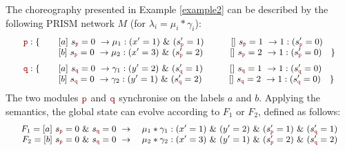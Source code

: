 \begin{example}\label{example3}
  The choreography presented in Example \ref{example2} can be
  described by the following PRISM network $M$ (for
  $\lambda_i=\mu_i*\gamma_i$):
\begin{displaymath}\small
  \begin{array}{llll}
    \role{p}: \{ & \quad \commandBase {a}{s_{\role p}=0} {\mu_1:(x'=1)
                   \ \&\ (s_{\role p}'=1)} 
                   \quad\qquad \commandBase {}{s_{\role p}=1} 
                   {1:(s_{\role p}'=0) }\\
                 & \quad \commandBase {b}{s_{\role p}=0} {\mu_2:(x'=3)
                   \ \&\ (s_{\role p}'=2)}
                   \quad\qquad \commandBase {}{s_{\role p}=2} 
                   {1:(s_{\role p}'=0) }\quad \}\\[2mm]
    \role{q}: \{ & \quad \commandBase {a}{s_{\role q}=0} {\gamma_1:(y'=2)
                   \ \&\ (s_{\role q}'=1) } 
                   \qquad\quad \commandBase {}{s_{\role q}=1} 
                   {1:(s_{\role q}'=0) }\\
                 & \quad \commandBase {b}{s_{\role q}=0} {\gamma_2:(y'=1)
                   \ \&\ (s_{\role q}'=2) } 
                   \qquad\quad \commandBase {}{s_{\role q}=2} 
                   {1:(s_{\role q}'=0) }\quad \}\\
  \end{array}
\end{displaymath}
The two modules $\role p$ and $\role q$ synchronise on the labels $a$
and $b$.  Applying the semantics, the global state can evolve
according to $F_1$ or $F_2$, defined as follows:
\begin{displaymath}\small
  \begin{array}{rlll}
    F_1=\commandBase {a}{s_{\role p}=0\ \&\ s_{\role q}=0} {\quad} \mu_1*\gamma_1 : 
    (x'=1) \ \&\ (y'=2) \ \&\ (s_{\role p}'=1) \ \&\ (s_{\role q}'=1) \\
    F_2=\commandBase {b}{s_{\role p}=0\ \&\ s_{\role q}=0} {\quad} \mu_2*\gamma_2 : 
    (x'=3) \ \&\ (y'=1) \ \&\  (s_{\role p}'=2) \ \&\ (s_{\role q}'=2)\\

  \end{array}
\end{displaymath} 

\end{example}

